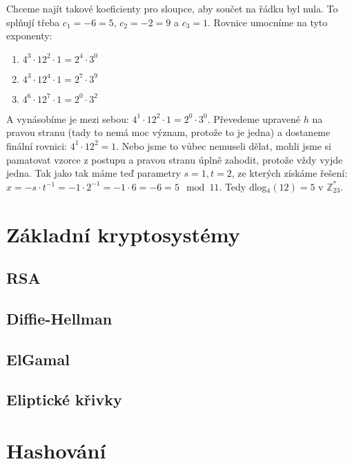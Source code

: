 \documentclass[10pt,a4paper]{article}
\begin{document}
\begin{exercise}
\begin{enumerate}
Chceme najít takové koeficienty pro sloupce, aby součet na řádku byl nula. To
splňují třeba $c_1 = -6 = 5$, $c_2 = -2 = 9$ a $c_3 = 1$.  Rovnice umocníme na
tyto exponenty:

\begin{enumerate}
\item $4^3\cdot 12^2 \cdot 1 = 2^4\cdot 3^0$
\item $4^3\cdot 12^4 \cdot 1 = 2^7\cdot 3^9$
\item $4^6\cdot 12^7 \cdot 1 = 2^0\cdot 3^2$
\end{enumerate}

A vynásobíme je mezi sebou: $4^1\cdot 12^2 \cdot 1 = 2^0\cdot 3^0$. Převedeme
upravené $h$ na pravou stranu (tady to nemá moc význam, protože to je jedna) a
dostaneme finální rovnici: $4^1\cdot 12^2  = 1$. Nebo jsme to vůbec nemuseli
dělat, mohli jsme si pamatovat vzorce z postupu a pravou stranu úplně zahodit,
protože vždy vyjde jedna. Tak jako tak máme teď parametry $s=1, t=2$, ze kterých
získáme řešení: $x = -s\cdot t^{-1} = -1 \cdot 2^{-1} = -1 \cdot 6 = -6 = 5 \mod
11$. Tedy dlog$_4(12) = 5$ v $\mathbb{Z}_{23}^*$.
\end{enumerate}

\end{exercise}

\section{Základní kryptosystémy}
\subsection{RSA}
\subsection{Diffie-Hellman}
\subsection{ElGamal}
\subsection{Eliptické křivky}

\section{Hashování}
\end{document}
